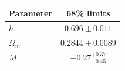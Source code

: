 \begin{tabular} { l  c}

 Parameter &  68\% limits\\
\hline
{\boldmath$h              $} & $0.696\pm 0.011            $\\

{\boldmath$Ω_m            $} & $0.2844\pm 0.0089          $\\

{\boldmath$M              $} & $-0.27^{+0.37}_{-0.45}     $\\
\hline
\end{tabular}